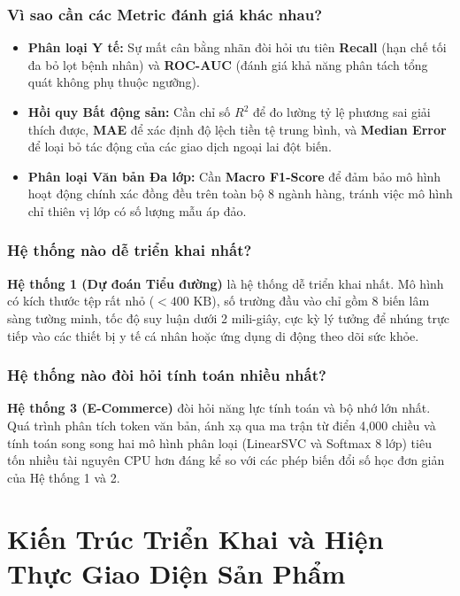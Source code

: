 \documentclass[12pt,a4paper]{report}
\begin{document}
\subsection{Vì sao cần các Metric đánh giá khác nhau?}
\begin{itemize}[leftmargin=2em]
    \item \textbf{Phân loại Y tế:} Sự mất cân bằng nhãn đòi hỏi ưu tiên \textbf{Recall} (hạn chế tối đa bỏ lọt bệnh nhân) và \textbf{ROC-AUC} (đánh giá khả năng phân tách tổng quát không phụ thuộc ngưỡng).
    \item \textbf{Hồi quy Bất động sản:} Cần chỉ số \textbf{$R^2$} để đo lường tỷ lệ phương sai giải thích được, \textbf{MAE} để xác định độ lệch tiền tệ trung bình, và \textbf{Median Error} để loại bỏ tác động của các giao dịch ngoại lai đột biến.
    \item \textbf{Phân loại Văn bản Đa lớp:} Cần \textbf{Macro F1-Score} để đảm bảo mô hình hoạt động chính xác đồng đều trên toàn bộ 8 ngành hàng, tránh việc mô hình chỉ thiên vị lớp có số lượng mẫu áp đảo.
\end{itemize}

\subsection{Hệ thống nào dễ triển khai nhất?}
\textbf{Hệ thống 1 (Dự đoán Tiểu đường)} là hệ thống dễ triển khai nhất. Mô hình có kích thước tệp rất nhỏ ($< 400\text{ KB}$), số trường đầu vào chỉ gồm 8 biến lâm sàng tường minh, tốc độ suy luận dưới 2 mili-giây, cực kỳ lý tưởng để nhúng trực tiếp vào các thiết bị y tế cá nhân hoặc ứng dụng di động theo dõi sức khỏe.

\subsection{Hệ thống nào đòi hỏi tính toán nhiều nhất?}
\textbf{Hệ thống 3 (E-Commerce)} đòi hỏi năng lực tính toán và bộ nhớ lớn nhất. Quá trình phân tích token văn bản, ánh xạ qua ma trận từ điển 4,000 chiều và tính toán song song hai mô hình phân loại (LinearSVC và Softmax 8 lớp) tiêu tốn nhiều tài nguyên CPU hơn đáng kể so với các phép biến đổi số học đơn giản của Hệ thống 1 và 2.

\chapter{Kiến Trúc Triển Khai và Hiện Thực Giao Diện Sản Phẩm}
\end{document}
